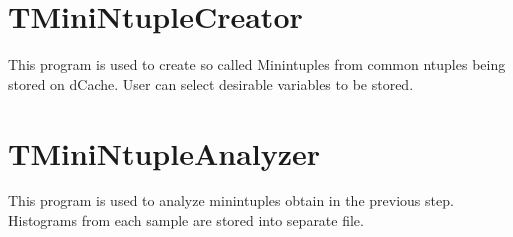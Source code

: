 \section{TMini\-Ntuple\-Creator}\label{index_TMiniNtupleCreator}
This program is used to create so called Minintuples from common ntuples being stored on d\-Cache. User can select desirable variables to be stored. \section{TMini\-Ntuple\-Analyzer}\label{index_TMiniNtupleAnalyzer}
This program is used to analyze minintuples obtain in the previous step. Histograms from each sample are stored into separate file. 